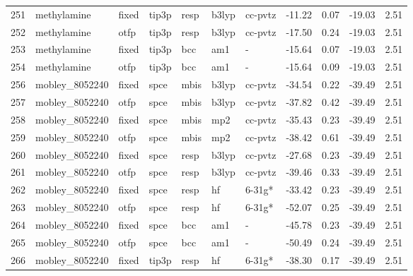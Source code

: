\begin{tabular}{lllllllrrrr}
251 &                   methylamine &  fixed &  tip3p &   resp &   b3lyp &      cc-pvtz &      -11.22 &     0.07 &      -19.03 &      2.51 \\
252 &                   methylamine &   otfp &  tip3p &   resp &   b3lyp &      cc-pvtz &      -17.50 &     0.24 &      -19.03 &      2.51 \\
253 &                   methylamine &  fixed &  tip3p &    bcc &     am1 &            - &      -15.64 &     0.07 &      -19.03 &      2.51 \\
254 &                   methylamine &   otfp &  tip3p &    bcc &     am1 &            - &      -15.64 &     0.09 &      -19.03 &      2.51 \\
256 &                mobley\_8052240 &  fixed &   spce &   mbis &   b3lyp &      cc-pvtz &      -34.54 &     0.22 &      -39.49 &      2.51 \\
257 &                mobley\_8052240 &   otfp &   spce &   mbis &   b3lyp &      cc-pvtz &      -37.82 &     0.42 &      -39.49 &      2.51 \\
258 &                mobley\_8052240 &  fixed &   spce &   mbis &     mp2 &      cc-pvtz &      -35.43 &     0.23 &      -39.49 &      2.51 \\
259 &                mobley\_8052240 &   otfp &   spce &   mbis &     mp2 &      cc-pvtz &      -38.42 &     0.61 &      -39.49 &      2.51 \\
260 &                mobley\_8052240 &  fixed &   spce &   resp &   b3lyp &      cc-pvtz &      -27.68 &     0.23 &      -39.49 &      2.51 \\
261 &                mobley\_8052240 &   otfp &   spce &   resp &   b3lyp &      cc-pvtz &      -39.46 &     0.33 &      -39.49 &      2.51 \\
262 &                mobley\_8052240 &  fixed &   spce &   resp &      hf &       6-31g* &      -33.42 &     0.23 &      -39.49 &      2.51 \\
263 &                mobley\_8052240 &   otfp &   spce &   resp &      hf &       6-31g* &      -52.07 &     0.25 &      -39.49 &      2.51 \\
264 &                mobley\_8052240 &  fixed &   spce &    bcc &     am1 &            - &      -45.78 &     0.23 &      -39.49 &      2.51 \\
265 &                mobley\_8052240 &   otfp &   spce &    bcc &     am1 &            - &      -50.49 &     0.24 &      -39.49 &      2.51 \\
266 &                mobley\_8052240 &  fixed &  tip3p &   resp &      hf &       6-31g* &      -38.30 &     0.17 &      -39.49 &      2.51 \\

\end{tabular}
